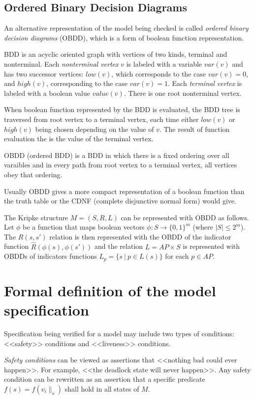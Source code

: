 \documentclass[a4paper,notitlepage,14pt]{article}
\begin{document}
\subsection{Ordered Binary Decision Diagrams}
\label{sec:order-binary-decis}

An alternative representation of the model being checked is called \emph{ordered binary decision
diagrams} (OBDD), which is a form of boolean function representation.

BDD is an acyclic oriented graph with vertices of two kinds, terminal and
nonterminal. Each \emph{nonterminal vertex} $v$ is labeled with a variable $var(v)$ and has two
successor vertices: $low(v)$, which corresponds to the case $var(v) = 0$, and $high(v)$,
corresponding to the case $var(v) = 1$. Each \emph{terminal vertex} is labeled with a boolean
value $value(v)$. There is one root nonterminal vertex.

When boolean function represented by the BDD is evaluated, the BDD tree is traversed from
root vertex to a terminal vertex, each time either $low(v)$ or $high(v)$ being chosen
depending on the value of $v$. The result of function evaluation the is the value of the
terminal vertex.

OBDD (ordered BDD) is a BDD in which there is a fixed ordering over all varaibles and
in every path from root vertex to a terminal vertex, all vertices obey that ordering.

Usually OBDD gives a more compact representation of a boolean function than the truth
table or the CDNF (complete disjunctive normal form) would give.

The Kripke structure $M = (S, R, L)$ can be represented with OBDD as follows. Let $\phi$
be a function that maps boolean vectors $\phi: S \rightarrow \{0, 1\}^m$  (where $|S| \leq
2^m$). The $R(s, s')$ relation is then represented with the OBDD of the indicator function
$\widehat{R}(\phi(s), \phi(s'))$ and the relation $L = AP \times S$ is represented with
OBDDs of indicators functions $L_p = \{s~|~p \in L(s) \}$ for each $p \in AP$.

\section{Formal definition of the model specification}
\label{sec:form-defin-model}

Specification being verified for a model may include two types of conditions: <<safety>>
conditions and <<liveness>> conditions.

\emph{Safety conditions} can be viewed as assertions that <<nothing bad could ever happen>>. For
example, <<the deadlock state will never happen>>. Any safety condition can be
rewritten as an assertion that a specific predicate $f(s) = f(v_i\|_s)$ shall hold in
all states of $M$.
\end{document}
